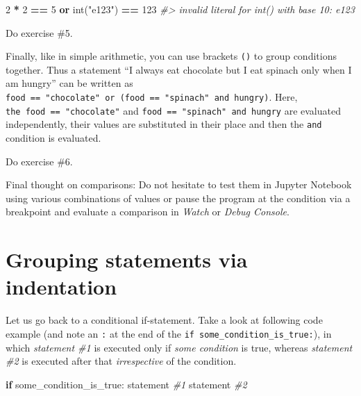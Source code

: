 \documentclass[
]{book}
\newenvironment{Shaded}{\begin{snugshade}}{\end{snugshade}}
\newcommand{\BuiltInTok}[1]{#1}
\newcommand{\CommentTok}[1]{\textcolor[rgb]{0.56,0.35,0.01}{\textit{#1}}}
\newcommand{\ControlFlowTok}[1]{\textcolor[rgb]{0.13,0.29,0.53}{\textbf{#1}}}
\newcommand{\DecValTok}[1]{\textcolor[rgb]{0.00,0.00,0.81}{#1}}
\newcommand{\KeywordTok}[1]{\textcolor[rgb]{0.13,0.29,0.53}{\textbf{#1}}}
\newcommand{\NormalTok}[1]{#1}
\newcommand{\OperatorTok}[1]{\textcolor[rgb]{0.81,0.36,0.00}{\textbf{#1}}}
\newcommand{\StringTok}[1]{\textcolor[rgb]{0.31,0.60,0.02}{#1}}
\begin{document}
\begin{Shaded}
\begin{Highlighting}[]
\DecValTok{2} \OperatorTok{*} \DecValTok{2} \OperatorTok{==} \DecValTok{5} \KeywordTok{or} \BuiltInTok{int}\NormalTok{(}\StringTok{"e123"}\NormalTok{) }\OperatorTok{==} \DecValTok{123}
\CommentTok{\#\textgreater{} invalid literal for int() with base 10: \textquotesingle{}e123\textquotesingle{}}
\end{Highlighting}
\end{Shaded}

Do exercise \#5.

Finally, like in simple arithmetic, you can use brackets \texttt{()} to group conditions together. Thus a statement ``I always eat chocolate but I eat spinach only when I am hungry'' can be written as \texttt{food\ ==\ "chocolate"\ or\ (food\ ==\ "spinach"\ and\ hungry)}. Here, \texttt{the\ food\ ==\ "chocolate"} and \texttt{food\ ==\ "spinach"\ and\ hungry} are evaluated independently, their values are substituted in their place and then the \texttt{and} condition is evaluated.

Do exercise \#6.

Final thought on comparisons: Do not hesitate to test them in Jupyter Notebook using various combinations of values or pause the program at the condition via a breakpoint and evaluate a comparison in \emph{Watch} or \emph{Debug Console}.

\hypertarget{indentation}{%
\section{Grouping statements via indentation}\label{indentation}}

Let us go back to a conditional if-statement. Take a look at following code example (and note an \texttt{:} at the end of the \texttt{if\ some\_condition\_is\_true:}), in which \emph{statement \#1} is executed only if \emph{some condition} is true, whereas \emph{statement \#2} is executed after that \emph{irrespective} of the condition.

\begin{Shaded}
\begin{Highlighting}[]
\ControlFlowTok{if}\NormalTok{ some\_condition\_is\_true:}
\NormalTok{    statement }\CommentTok{\#1}
\NormalTok{statement }\CommentTok{\#2 }
\end{Highlighting}
\end{Shaded}
\end{document}
